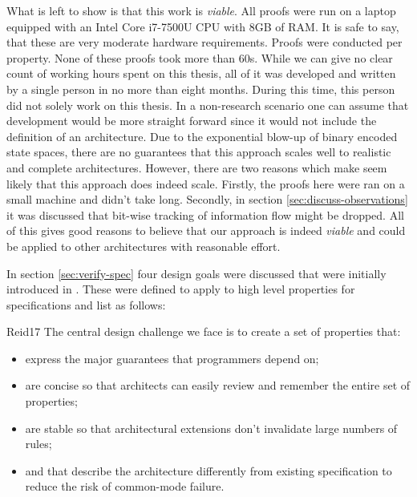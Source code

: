 What is left to show is that this work is \textit{viable}.
All proofs were run on a laptop equipped with an Intel Core i7-7500U CPU with 8GB of RAM.
It is safe to say, that these are very moderate hardware requirements.
Proofs were conducted per property.
None of these proofs took more than 60s.
While we can give no clear count of working hours spent on this thesis, all of it was developed and written by a single person in no more than eight months.
During this time, this person did not solely work on this thesis.
In a non-research scenario one can assume that development would be more straight forward since it would not include the definition of an architecture.
Due to the exponential blow-up of binary encoded state spaces, there are no guarantees that this approach scales well to realistic and complete architectures.
However, there are two reasons which make seem likely that this approach does indeed scale.
Firstly, the proofs here were ran on a small machine and didn't take long.
Secondly, in section \ref{sec:discuss-observations} it was discussed that bit-wise tracking of information flow might be dropped.
All of this gives good reasons to believe that our approach is indeed \textit{viable} and could be applied to other architectures with reasonable effort.

In section \ref{sec:verify-spec} four design goals were discussed that were initially introduced in \cite{Reid17}.
These were defined to apply to high level properties for specifications and list as follows:
\begin{displaycquote}[pp.88:2-3]{Reid17}
    The central design challenge we face is to create a set of properties that:
    \begin{itemize}
        \item express the major guarantees that programmers depend on;
        \item are concise so that architects can easily review and remember the entire set of properties;
        \item are stable so that architectural extensions don't invalidate large numbers of rules;
        \item and that describe the architecture differently from existing specification to reduce the risk of common-mode failure.
    \end{itemize}
\end{displaycquote}


